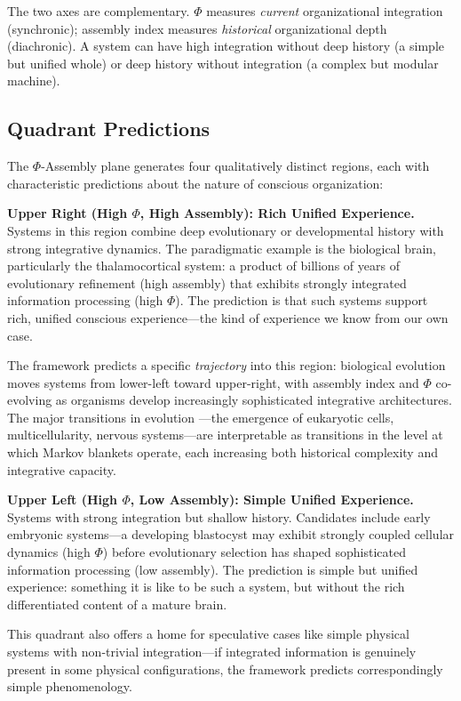 \documentclass[11pt,a4paper]{article}
\theoremstyle{definition}
\theoremstyle{plain}
\theoremstyle{remark}
\begin{document}
The two axes are complementary. $\Phi$ measures \textit{current} organizational integration (synchronic); assembly index measures \textit{historical} organizational depth (diachronic). A system can have high integration without deep history (a simple but unified whole) or deep history without integration (a complex but modular machine).

\subsection{Quadrant Predictions}\label{sec:quadrants}

The $\Phi$-Assembly plane generates four qualitatively distinct regions, each with characteristic predictions about the nature of conscious organization:

\textbf{Upper Right (High $\Phi$, High Assembly): Rich Unified Experience.} Systems in this region combine deep evolutionary or developmental history with strong integrative dynamics. The paradigmatic example is the biological brain, particularly the thalamocortical system: a product of billions of years of evolutionary refinement (high assembly) that exhibits strongly integrated information processing (high $\Phi$). The prediction is that such systems support rich, unified conscious experience---the kind of experience we know from our own case.

The framework predicts a specific \textit{trajectory} into this region: biological evolution moves systems from lower-left toward upper-right, with assembly index and $\Phi$ co-evolving as organisms develop increasingly sophisticated integrative architectures. The major transitions in evolution \citep{MaynardSmith1995}---the emergence of eukaryotic cells, multicellularity, nervous systems---are interpretable as transitions in the level at which Markov blankets operate, each increasing both historical complexity and integrative capacity.

\textbf{Upper Left (High $\Phi$, Low Assembly): Simple Unified Experience.} Systems with strong integration but shallow history. Candidates include early embryonic systems---a developing blastocyst may exhibit strongly coupled cellular dynamics (high $\Phi$) before evolutionary selection has shaped sophisticated information processing (low assembly). The prediction is simple but unified experience: something it is like to be such a system, but without the rich differentiated content of a mature brain.

This quadrant also offers a home for speculative cases like simple physical systems with non-trivial integration---if integrated information is genuinely present in some physical configurations, the framework predicts correspondingly simple phenomenology.
\end{document}
